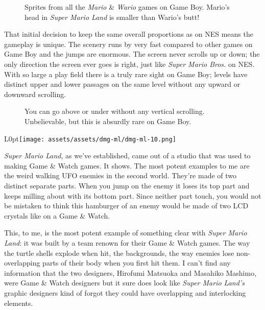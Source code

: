 \documentclass{book}
\begin{document}
\FloatBarrier\vspace{\baselineskip}\begin{figure}[H]\caption*{Sprites from all the \emph{Mario} \& \emph{Wario} games on Game Boy. Mario’s head in \emph{Super Mario Land} is smaller than Wario’s butt!}\end{figure}
That initial decision to keep the same overall proportions as on NES means the gameplay is unique. The scenery runs by very fast compared to other games on Game Boy and the jumps are enormous. The screen never scrolls up or down; the only direction the screen ever goes is right, just like \emph{Super Mario Bros.} on NES. With so large a play field there is a truly rare sight on Game Boy; levels have distinct upper and lower passages on the same level without any upward or downward scrolling.\par
\FloatBarrier\vspace{\baselineskip}\begin{figure}[H]\caption*{You can go above or under without any vertical scrolling. Unbelievable, but this is absurdly rare on Game Boy.}\end{figure}
\begin{wrapfigure}{L}{0pt}{\texttt{[image: assets/assets/dmg-ml/dmg-ml-10.png]}}\end{wrapfigure}\noindent
\emph{Super Mario Land}, as we’ve established, came out of a studio that was used to making Game \& Watch games. It shows. The most potent examples to me are the weird walking UFO enemies in the second world. They’re made of two distinct separate parts. When you jump on the enemy it loses its top part and keeps milling about with its bottom part. Since neither part touch, you would not be mistaken to think this hamburger of an enemy would be made of two LCD crystals like on a Game \& Watch.\par
This, to me, is the most potent example of something clear with \emph{Super Mario Land}: it was built by a team renown for their Game \& Watch games. The way the turtle shells explode when hit, the backgrounds, the way enemies lose non-overlapping parts of their body when you first hit them. I can’t find any information that the two designers, Hirofumi Matsuoka and Masahiko Mashimo, were Game \& Watch designers but it sure does look like \emph{Super Mario Land’s} graphic designers kind of forgot they could have overlapping and interlocking elements.\par
\end{document}
